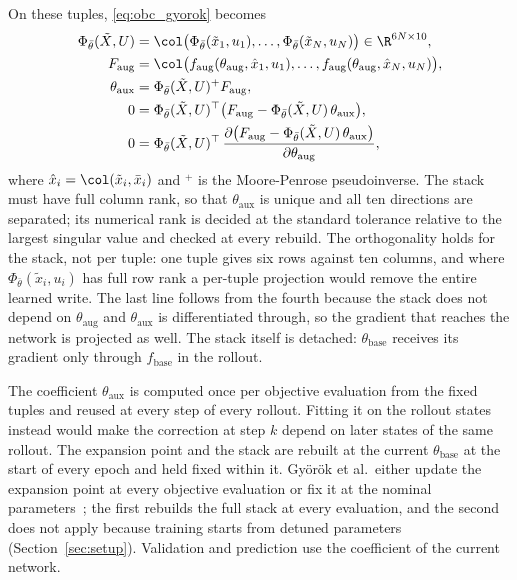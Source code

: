 On these tuples, \eqref{eq:obc_gyorok} becomes
\begin{equation}
\begin{aligned}
 \Phi_{\bar\theta}(\tilde X,U)
 &=\col\bigl(\Phi_{\bar\theta}(\tilde x_1,u_1),\dots,
   \Phi_{\bar\theta}(\tilde x_N,u_N)\bigr)\in\R^{6N\times10},\\
 F_{\mathrm{aug}}
 &=\col\bigl(f_{\mathrm{aug}}(\theta_{\mathrm{aug}},\hat x_1,u_1),\dots,
   f_{\mathrm{aug}}(\theta_{\mathrm{aug}},\hat x_N,u_N)\bigr),\\
 \theta_{\mathrm{aux}}&=\Phi_{\bar\theta}(\tilde X,U)^{+}F_{\mathrm{aug}},\\
 0&=\Phi_{\bar\theta}(\tilde X,U)^\top
   \bigl(F_{\mathrm{aug}}-\Phi_{\bar\theta}(\tilde X,U)\,\theta_{\mathrm{aux}}\bigr),\\
 0&=\Phi_{\bar\theta}(\tilde X,U)^\top\,
   \frac{\partial\bigl(F_{\mathrm{aug}}-\Phi_{\bar\theta}(\tilde X,U)\,
   \theta_{\mathrm{aux}}\bigr)}{\partial\theta_{\mathrm{aug}}},
\end{aligned}
\label{eq:obc_ours}
\end{equation}
where $\hat x_i=\col(\tilde x_i,\bar x_i)$ and $^{+}$ is the Moore-Penrose
pseudoinverse.
The stack must have full column rank, so that $\theta_{\mathrm{aux}}$ is unique
and all ten directions are separated; its numerical rank is decided at the
standard tolerance relative to the largest singular value and checked at every
rebuild.
The orthogonality holds for the stack, not per tuple: one tuple gives six rows
against ten columns, and where $\Phi_{\bar\theta}(\tilde x_i,u_i)$ has full row
rank a per-tuple projection would remove the entire learned write.
The last line follows from the fourth because the stack does not depend on
$\theta_{\mathrm{aug}}$ and $\theta_{\mathrm{aux}}$ is differentiated through,
so the gradient that reaches the network is projected as well.
The stack itself is detached: $\theta_{\mathrm{base}}$ receives its gradient
only through $f_{\mathrm{base}}$ in the rollout.

The coefficient $\theta_{\mathrm{aux}}$ is computed once per objective
evaluation from the fixed tuples and reused at every step of every rollout.
Fitting it on the rollout states instead would make the correction at step $k$
depend on later states of the same rollout.
The expansion point and the stack are rebuilt at the current
$\theta_{\mathrm{base}}$ at the start of every epoch and held fixed within it.
Gy\"or\"ok et al.\ either update the expansion point at every objective
evaluation or fix it at the nominal parameters~\cite[Sec.~4]{gyorok2025l4dc}; the
first rebuilds the full stack at every evaluation, and the second does not apply
because training starts from detuned parameters (Section~\ref{sec:setup}).
Validation and prediction use the coefficient of the current network.


